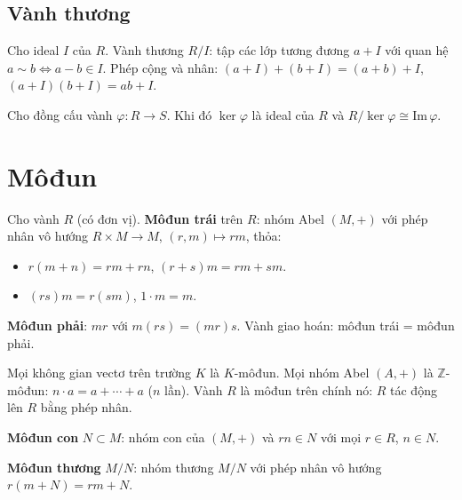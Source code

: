 \documentclass[12pt,a4paper]{article}
\begin{document}
\subsection{Vành thương}

\begin{dinhnghia}
  Cho ideal $I$ của $R$. Vành thương $R/I$: tập các lớp tương đương $a + I$ với quan hệ $a \sim b \Leftrightarrow a - b \in I$. Phép cộng và nhân: $(a+I) + (b+I) = (a+b) + I$, $(a+I)(b+I) = ab + I$.
\end{dinhnghia}

\begin{dinhly}[title={Định lý đồng cấu vành}]
  Cho đồng cấu vành $\varphi: R \to S$. Khi đó $\ker \varphi$ là ideal của $R$ và $R/\ker \varphi \cong \mathrm{Im}\,\varphi$.
\end{dinhly}

\section{Môđun}

\begin{dinhnghia}
  Cho vành $R$ (có đơn vị). \textbf{Môđun trái} trên $R$: nhóm Abel $(M, +)$ với phép nhân vô hướng $R \times M \to M$, $(r, m) \mapsto rm$, thỏa:
  \begin{itemize}
    \item $r(m + n) = rm + rn$, $(r + s)m = rm + sm$.
    \item $(rs)m = r(sm)$, $1 \cdot m = m$.
  \end{itemize}
  \textbf{Môđun phải}: $mr$ với $m(rs) = (mr)s$. Vành giao hoán: môđun trái = môđun phải.
\end{dinhnghia}

\begin{vidu}
  Mọi không gian vectơ trên trường $K$ là $K$-môđun. Mọi nhóm Abel $(A, +)$ là $\mathbb{Z}$-môđun: $n \cdot a = a + \cdots + a$ ($n$ lần). Vành $R$ là môđun trên chính nó: $R$ tác động lên $R$ bằng phép nhân.
\end{vidu}

\begin{dinhnghia}
  \textbf{Môđun con} $N \subset M$: nhóm con của $(M,+)$ và $rn \in N$ với mọi $r \in R$, $n \in N$.
\end{dinhnghia}

\begin{dinhnghia}
  \textbf{Môđun thương} $M/N$: nhóm thương $M/N$ với phép nhân vô hướng $r(m + N) = rm + N$.
\end{dinhnghia}
\end{document}

